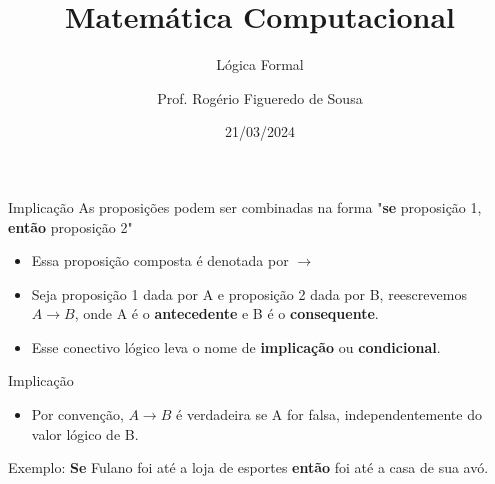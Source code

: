 \documentclass[aspectratio=169]{beamer}
\title{Matemática Computacional}
\subtitle{Lógica Formal}
\author{Prof. Rogério Figueredo de Sousa}
\institute{%
\href{rogerio.sousa@ifpi.edu.br}{rogerio.sousa@ifpi.edu.br}%
}%
\date{21/03/2024}
\begin{document}
\begin{frame}[plain]
    \titlepage
\end{frame}




\jsonp
{}
\begin{frame}{Implicação}
    As proposições podem ser combinadas na forma "\textbf{se} proposição 1, \textbf{então} proposição 2"
    \begin{itemize}
        \item Essa proposição composta é denotada por $\rightarrow$
        \item Seja proposição 1 dada por A e proposição 2 dada por B,
              reescrevemos $A \rightarrow B$, onde A é o \textbf{antecedente} e
              B é o \textbf{consequente}.
        \item Esse conectivo lógico leva o nome de \textbf{implicação} ou \textbf{condicional}.
    \end{itemize}
\end{frame}


\begin{frame}{Implicação}
    \begin{itemize}
        \item Por convenção, $A \rightarrow B$ é verdadeira se A for falsa, independentemente do valor lógico de B.
    \end{itemize}

    \vspace{4mm}

    Exemplo: \textbf{Se} Fulano foi até a loja de esportes \textbf{então} foi
    até a casa de sua avó.
\end{frame}
\end{document}
